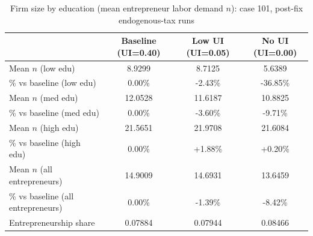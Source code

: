 \begin{table}[H]
\caption{Firm size by education (mean entrepreneur labor demand $n$): case 101, post-fix endogenous-tax runs}
\label{tab:firm_size_edu_case101_postfix}
\centering
\small
\begin{tabular}{|l|c|c|c|}
\hline
 & Baseline (UI=0.40) & Low UI (UI=0.05) & No UI (UI=0.00) \\
\hline
Mean $n$ (low edu) & 8.9299 & 8.7125 & 5.6389 \\
\hline
\% vs baseline (low edu) & 0.00\% & -2.43\% & -36.85\% \\
\hline
Mean $n$ (med edu) & 12.0528 & 11.6187 & 10.8825 \\
\hline
\% vs baseline (med edu) & 0.00\% & -3.60\% & -9.71\% \\
\hline
Mean $n$ (high edu) & 21.5651 & 21.9708 & 21.6084 \\
\hline
\% vs baseline (high edu) & 0.00\% & +1.88\% & +0.20\% \\
\hline
Mean $n$ (all entrepreneurs) & 14.9009 & 14.6931 & 13.6459 \\
\hline
\% vs baseline (all entrepreneurs) & 0.00\% & -1.39\% & -8.42\% \\
\hline
Entrepreneurship share & 0.07884 & 0.07944 & 0.08466 \\
\hline
\end{tabular}
\end{table}
